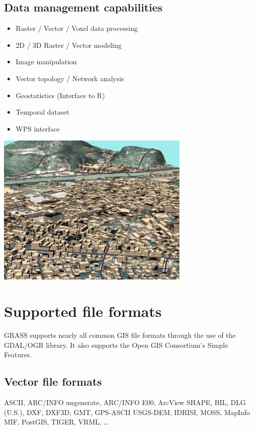 \documentclass[notumble,a4paper,10pt,nofoldmark]{leaflet}
\newenvironment{myfig}[1][0pt plus 1.5ex minus .5ex]{\par\vspace*{#1}\begin{minipage}{\textwidth}\centering}{\end{minipage}}
\begin{document}
\subsection{Data management capabilities}

\begin{itemize}
\item Raster / Vector / Voxel data processing
\item 2D / 3D Raster / Vector modeling
\item Image manipulation
\item Vector topology / Network analysis
\item Geostatistics (Interface to R)
\item Temporal dataset
\item WPS interface
\end{itemize}

\begin{myfig}[1ex]
\includegraphics[width=0.7\textwidth]{trento3d}
\end{myfig}

\section{Supported file formats}

GRASS supports nearly all common GIS file formats through the use of the GDAL/OGR library. It also supports the Open GIS Consortium's Simple Features.

\subsection{Vector file formats}
ASCII, ARC/INFO ungenerate, ARC/INFO E00, Arc\-View SHAPE, BIL, DLG (U.S.), DXF, DXF3D, GMT, GPS-ASCII USGS-DEM, IDRISI, MOSS, MapInfo MIF, PostGIS, TIGER, VRML, \dots
\end{document}
